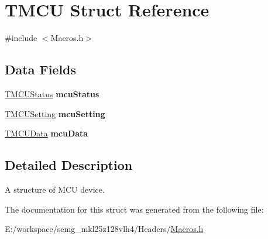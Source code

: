 \hypertarget{struct_t_m_c_u}{\section{T\-M\-C\-U Struct Reference}
\label{struct_t_m_c_u}
}


{\ttfamily \#include $<$Macros.\-h$>$}

\subsection*{Data Fields}
\begin{DoxyCompactItemize}
\item 
\hypertarget{struct_t_m_c_u_a59e5d37dc806e39cb554793222f38c0e}{\hyperlink{struct_t_m_c_u_status}{T\-M\-C\-U\-Status} {\bfseries mcu\-Status}}\label{struct_t_m_c_u_a59e5d37dc806e39cb554793222f38c0e}

\item 
\hypertarget{struct_t_m_c_u_a00cedc6229e283c773d6db9310d3dea5}{\hyperlink{struct_t_m_c_u_setting}{T\-M\-C\-U\-Setting} {\bfseries mcu\-Setting}}\label{struct_t_m_c_u_a00cedc6229e283c773d6db9310d3dea5}

\item 
\hypertarget{struct_t_m_c_u_a8c7ead8e2d20c1cd31c3de83dd217785}{\hyperlink{struct_t_m_c_u_data}{T\-M\-C\-U\-Data} {\bfseries mcu\-Data}}\label{struct_t_m_c_u_a8c7ead8e2d20c1cd31c3de83dd217785}

\end{DoxyCompactItemize}


\subsection{Detailed Description}
A structure of M\-C\-U device. 

The documentation for this struct was generated from the following file\-:\begin{DoxyCompactItemize}
\item 
E\-:/workspace/semg\-\_\-mkl25z128vlh4/\-Headers/\hyperlink{_macros_8h}{Macros.\-h}\end{DoxyCompactItemize}
